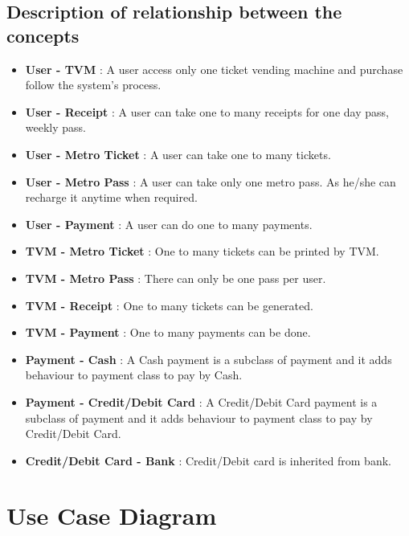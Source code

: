 \documentclass[15pt]{article}
\begin{document}
\subsection{\Large{Description of relationship between the concepts}}
        \begin{itemize}
            \item {\Large\bfseries User - TVM} : A user access only one ticket vending machine and purchase follow the system's process.
            \item {\Large\bfseries User - Receipt } : A user can take one to many receipts for one day pass, weekly pass.
            \item {\Large\bfseries User - Metro Ticket} : A user can take one to many tickets.
            \item {\Large\bfseries User - Metro Pass} : A user can take only one metro pass. As he/she can recharge it anytime when required.
            \item {\Large\bfseries User - Payment} :  A user can do one to many payments.
            \item {\Large\bfseries TVM - Metro Ticket} : One to many tickets can be printed by TVM.
             \item {\Large\bfseries TVM - Metro Pass} : There can only be one pass per user.
             \item {\Large\bfseries TVM - Receipt} : One to many tickets can be generated.
            \item {\Large\bfseries TVM - Payment } : One to many payments can be done.
            \item {\Large\bfseries Payment - Cash} : A Cash payment is a subclass of payment and it adds behaviour to payment class to pay by Cash.
            \item {\Large\bfseries Payment - Credit/Debit Card} : A Credit/Debit Card payment is a subclass of payment and it adds behaviour to payment class to pay by Credit/Debit Card.
            \item {\Large\bfseries Credit/Debit Card - Bank} : Credit/Debit card is inherited from bank.
        \end{itemize}       
        
        
\section{\Large{Use Case Diagram}}
\end{document}

